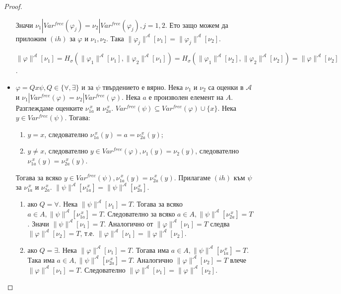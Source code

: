 \documentclass{article}
\begin{document}
\begin{claim}
\begin{proof}
\begin{itemize}
Значи $\nu_1 | Var^{free}(\varphi_j) = \nu_2 | Var^{free}(\varphi_j), j = 1,2$. Ето защо можем да приложим $(ih)$ за $\varphi$ и $\nu_1, \nu_2$. Така $\|\varphi_j\|^\mathcal{A}[\nu_1] = \|\varphi_j\|^\mathcal{A}[\nu_2]$.

$\|\varphi\|^\mathcal{A}[\nu_1] = H_\sigma(\|\varphi_1\|^\mathcal{A}[\nu_1], \|\varphi_2\|^\mathcal{A}[\nu_1]) = H_\sigma(\|\varphi_1\|^\mathcal{A}[\nu_2], \|\varphi_2\|^\mathcal{A}[\nu_2]) = \|\varphi\|^\mathcal{A}[\nu_2]$.

\item $\varphi = Qx\psi, Q \in \{\forall, \exists\}$ и за $\psi$ твърдението е вярно. Нека $\nu_1$ и $\nu_2$ са оценки в $\mathcal{A}$ и $\nu_1 | Var^{free}(\varphi) = \nu_2 | Var^{free}(\varphi)$. Нека $a$ е произволен елемент на $A$. Разглеждаме оценките $\nu_{1a}^{\ x}$ и $\nu_{2a}^{\ x}$. $Var^{free}(\psi) \subseteq Var^{free}(\varphi) \cup \{x\}$. Нека $y \in Var^{free}(\psi)$. Тогава:

\begin{enumerate}[label=(\alph*)]
\item $y = x$, следователно $\nu_{1a}^{\ x}(y) = a = \nu_{2a}^{\ x}(y)$;
\item $y \neq x$, следователно $y \in Var^{free}(\varphi), \nu_1(y) = \nu_2(y)$, следователно $\nu_{1a}^{\ x}(y) = \nu_{2a}^{\ x}(y)$.
\end{enumerate}

Тогава за всяко $y \in Var^{free}(\psi), \nu_{1a}^{\ x}(y) = \nu_{2a}^{\ x}(y)$. Прилагаме $(ih)$ към $\psi$ за $\nu_{1a}^{\ x}$ и $\nu_{2a}^{\ x}$. $\|\psi\|^\mathcal{A}[\nu_{1a}^{\ x}] = \|\psi\|^\mathcal{A}[\nu_{2a}^{\ x}]$.

\begin{enumerate}[label=(\alph*)]
\item ако $Q = \forall$. Нека $\|\psi\|^\mathcal{A}[\nu_1] = T$. Тогава за всяко $a \in A, \|\psi\|^\mathcal{A}[\nu_{1a}^{\ x}] = T$. Следователно за всяко $a \in A, \|\psi\|^\mathcal{A}[\nu_{2a}^{\ x}] = T$. Значи $\|\psi\|^\mathcal{A}[\nu_1] = T$. Аналогично от $\|\varphi\|^\mathcal{A}[\nu_1] = T$ следва $\|\varphi\|^\mathcal{A}[\nu_2] = T$, т.е. $\|\varphi\|^\mathcal{A}[\nu_1] = \|\varphi\|^\mathcal{A}[\nu_2]$.
\item ако $Q = \exists$. Нека $\|\varphi\|^\mathcal{A}[\nu_1] = T$. Тогава има $a \in A, \|\psi\|^\mathcal{A}[\nu_{1a}^{\ x}] = T$. Така има $a \in A, \|\psi\|^\mathcal{A}[\nu_{2a}^{\ x}] = T$. Аналогично $\|\varphi\|^\mathcal{A}[\nu_2] = T$ влече $\|\varphi\|^\mathcal{A}[\nu_1] = T$. Следователно $\|\varphi\|^\mathcal{A}[\nu_1] = \|\varphi\|^\mathcal{A}[\nu_2]$.
\end{enumerate}

\end{itemize}
\end{proof}
\fi
\end{claim}
\end{document}

